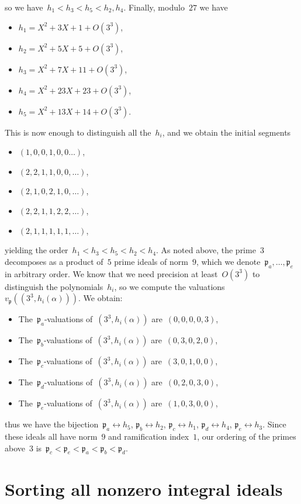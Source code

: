 \documentclass{article}
\def\p{{\mathfrak p}}
\begin{document}
so we have~$h_1<h_3<h_5<h_2,h_4$. Finally, modulo~$27$ we have
\begin{itemize}
  \item $h_1 = X^2 + 3X + 1 + O(3^3)$,
  \item $h_2 = X^2 + 5X + 5 + O(3^3)$,
  \item $h_3 = X^2 + 7X + 11 + O(3^3)$,
  \item $h_4 = X^2 + 23X + 23 + O(3^3)$,
  \item $h_5 = X^2 + 13X + 14 + O(3^3)$.
\end{itemize}
This is now enough to distinguish all the~$h_i$, and we obtain the initial segments
\begin{itemize}
  \item $(1,0,0,1,0,0\dots)$,
  \item $(2,2,1,1,0,0,\dots)$,
  \item $(2,1,0,2,1,0,\dots)$,
  \item $(2,2,1,1,2,2,\dots)$,
  \item $(2,1,1,1,1,1,\dots)$,
\end{itemize}
yielding the order~$h_1 < h_3 < h_5 < h_2 < h_4$.
As noted above, the prime~$3$ decomposes as a product of~$5$ prime ideals of norm~$9$,
which we denote~$\p_a, \dots, \p_e$ in arbitrary order. We know that we need
precision at least~$O(3^3)$ to distinguish the polynomials~$h_i$, so we compute
the valuations~$v_\p((3^3,h_i(\alpha)))$. We obtain:
\begin{itemize}
  \item The~$\p_a$-valuations of~$(3^3,h_i(\alpha))$ are~$(0,0,0,0,3)$,
  \item The~$\p_b$-valuations of~$(3^3,h_i(\alpha))$ are~$(0,3,0,2,0)$,
  \item The~$\p_c$-valuations of~$(3^3,h_i(\alpha))$ are~$(3,0,1,0,0)$,
  \item The~$\p_d$-valuations of~$(3^3,h_i(\alpha))$ are~$(0,2,0,3,0)$,
  \item The~$\p_e$-valuations of~$(3^3,h_i(\alpha))$ are~$(1,0,3,0,0)$,
\end{itemize}
thus we have the bijection~$\p_a\leftrightarrow h_5$, $\p_b\leftrightarrow h_2$,
$\p_c\leftrightarrow h_1$, $\p_d\leftrightarrow h_4$, $\p_e\leftrightarrow h_3$.
Since these ideals all have norm~$9$ and ramification index~$1$, our ordering of
the primes above~$3$ is~$\p_c < \p_e < \p_a < \p_b < \p_d$.

\section{Sorting all nonzero integral ideals}
\end{document}
